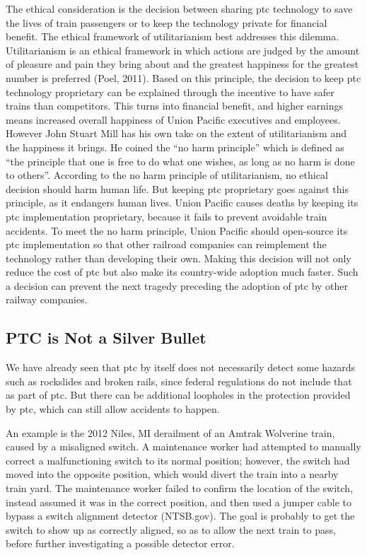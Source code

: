 \documentclass[11pt, titlepage]{article}
\begin{document}
The ethical consideration is the decision between sharing \gls{ptc} technology to
save the lives of train passengers or to keep the technology private for financial
benefit. The ethical framework of utilitarianism best addresses this dilemma.
Utilitarianism is an ethical framework in which actions are judged by the amount of
pleasure and pain they bring about and the greatest happiness for the greatest
number is preferred (Poel, 2011). Based on this principle, the decision to keep
\gls{ptc} technology proprietary can be explained through the incentive to have
safer trains than competitors. This turns into financial benefit, and higher
earnings means increased overall happiness of Union Pacific executives and
employees. However John Stuart Mill has his own take on the extent of utilitarianism
and the happiness it brings. He coined the ``no harm principle'' which is defined as
``the principle that one is free to do what one wishes, as long as no harm is done
to others''. According to the no harm principle of utilitarianism, no ethical
decision should harm human life. But keeping \gls{ptc} proprietary goes against this
principle, as it endangers human lives. Union Pacific causes deaths by keeping its
\gls{ptc} implementation proprietary, because it fails to prevent avoidable train
accidents. To meet the no harm principle, Union Pacific should open-source its
\gls{ptc} implementation so that other railroad companies can reimplement the
technology rather than developing their own. Making this decision will not only
reduce the cost of \gls{ptc} but also make its country-wide adoption much faster.
Such a decision can prevent the next tragedy preceding the adoption of \gls{ptc} by
other railway companies.

\subsection{PTC is Not a Silver Bullet}

We have already seen that \gls{ptc} by itself does not necessarily detect some
hazards such as rockslides and broken rails, since federal regulations do not
include that as part of \gls{ptc}. But there can be additional loopholes in the
protection provided by \gls{ptc}, which can still allow accidents to happen.

An example is the 2012 Niles, MI derailment of an Amtrak Wolverine train, caused by
a misaligned switch. A maintenance worker had attempted to manually correct a
malfunctioning switch to its normal position; however, the switch had moved into the
opposite position, which would divert the train into a nearby train yard. The
maintenance worker failed to confirm the location of the switch, instead assumed it
was in the correct position, and then used a jumper cable to bypass a switch
alignment detector (NTSB.gov). The goal is probably to get the switch to show up as
correctly aligned, so as to allow the next train to pass, before further
investigating a possible detector error.
\end{document}
